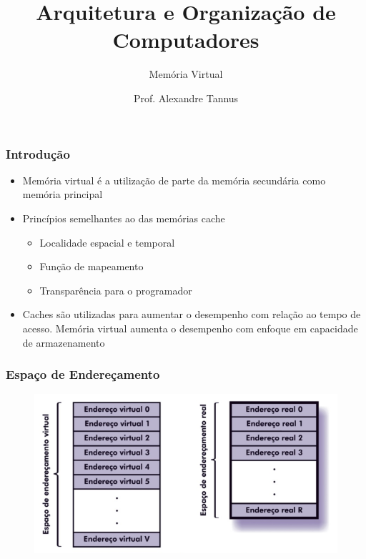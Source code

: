 \documentclass[aspectratio=169,
				xcolor=table]{beamer}
\title[]{Arquitetura e Organização de Computadores}
\subtitle[]{Memória Virtual}
\author[]{Prof. Alexandre Tannus}
\date{}
\begin{document}
	\begin{frame}
		\titlepage
	\end{frame}

	\begin{frame}
		\tableofcontents		
	\end{frame}	
	
	\begin{frame}
		\frametitle{Introdução}
		\begin{itemize}
			\item Memória virtual é a utilização de parte da memória secundária como memória principal
			\vspace{1em}
			\item Princípios semelhantes ao das memórias cache
			\begin{itemize}
				\item Localidade espacial e temporal
				\item Função de mapeamento
				\item Transparência para o programador
			\end{itemize}
			\item Caches são utilizadas para aumentar o desempenho com relação ao tempo de acesso. Memória virtual aumenta o desempenho com enfoque em capacidade de armazenamento
		\end{itemize}
		
	\end{frame}
	
	\begin{frame}
		\frametitle{Espaço de Endereçamento}
		\begin{figure}[hbtp]
		\centering
		\includegraphics[height=0.75\textheight, keepaspectratio]{../figs/cap09/enderecamento.png}
		\end{figure}
		
	\end{frame}
\end{document}
